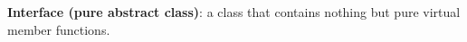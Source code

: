 \documentclass[7pt, twocolumn]{extarticle}
\newcommand{\myinline}[1]{\lstinline[basicstyle={\fontsize{5pt}{6}\ttfamily}]{#1}}
\begin{document}
\begin{small}
\begin{minipage}[h]{5.8cm}

    \smallskip
    \textbf{Interface (pure abstract class)}: a class that contains nothing but pure virtual member functions.
      
      
      
      

\end{minipage}
\end{small}
\end{document}
